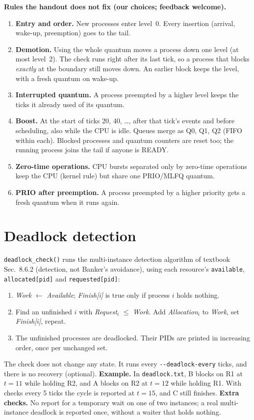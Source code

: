 \documentclass[10pt,a4paper]{article}
\newcommand{\code}[1]{\texttt{#1}}
\begin{document}
\textbf{Rules the handout does not fix (our choices; feedback welcome).}
\begin{enumerate}[label=(\arabic*)]
\item \textbf{Entry and order.} New processes enter level~0. Every insertion (arrival, wake-up, preemption) goes to the tail.
\item \textbf{Demotion.} Using the whole quantum moves a process down one level (at most level~2). The check runs right after its last tick, so a process that blocks \emph{exactly} at the boundary still moves down. An earlier block keeps the level, with a fresh quantum on wake-up.
\item \textbf{Interrupted quantum.} A process preempted by a higher level keeps the ticks it already used of its quantum.
\item \textbf{Boost.} At the start of ticks 20, 40, \dots, after that tick's events and before scheduling, also while the CPU is idle. Queues merge as Q0, Q1, Q2 (FIFO within each). Blocked processes and quantum counters are reset too; the running process joins the tail if anyone is READY.
\item \textbf{Zero-time operations.} CPU bursts separated only by zero-time operations keep the CPU (kernel rule) but share one PRIO/MLFQ quantum.
\item \textbf{PRIO after preemption.} A process preempted by a higher priority gets a fresh quantum when it runs again.
\end{enumerate}

\section{Deadlock detection}
\code{deadlock\_check()} runs the multi-instance detection algorithm of textbook Sec.~8.6.2
(detection, not Banker's avoidance), using each resource's \code{available}, \code{allocated[pid]} and \code{requested[pid]}:
\begin{enumerate}[label=(\arabic*)]
\item \textit{Work} $\leftarrow$ \textit{Available}; \textit{Finish[i]} is true only if process $i$ holds nothing.
\item Find an unfinished $i$ with \textit{Request$_i$} $\le$ \textit{Work}. Add \textit{Allocation$_i$} to \textit{Work}, set \textit{Finish[i]}, repeat.
\item The unfinished processes are deadlocked. Their PIDs are printed in increasing order, once per unchanged set.
\end{enumerate}
The check does not change any state. It runs every \code{-{}-deadlock-every} ticks, and there is no recovery (optional).
\textbf{Example.} In \code{deadlock.txt}, B blocks on R1 at $t=11$ while holding R2, and A blocks on R2 at $t=12$ while holding R1.
With checks every 5 ticks the cycle is reported at $t=15$, and C still finishes.
\textbf{Extra checks.} No report for a temporary wait on one of two instances; a real multi-instance deadlock is reported once, without a waiter that holds nothing.
\end{document}
